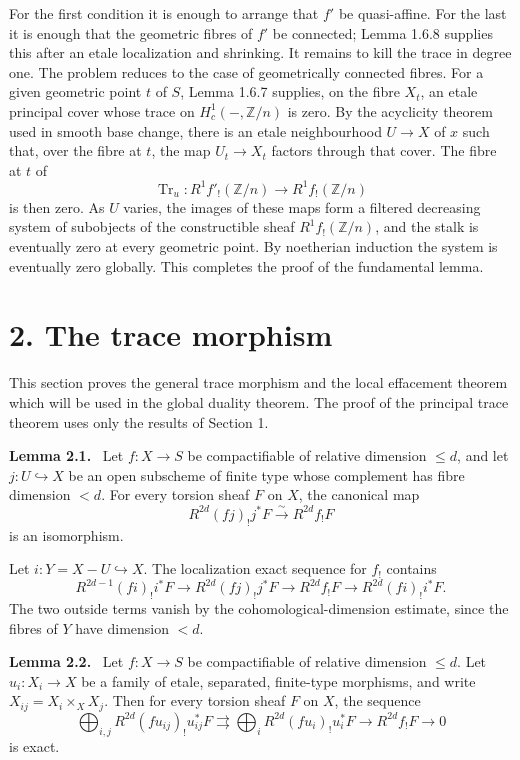 \documentclass[12pt]{article}
\newcommand{\Zz}{\mathbb Z}
\newenvironment{statement}[1]{\par\medskip\noindent\textbf{#1.}\ }{\par\medskip}
\begin{document}
For the first condition it is enough to arrange that \(f'\) be quasi-affine. For the last it is enough that the geometric fibres of \(f'\) be connected; Lemma 1.6.8 supplies this after an etale localization and shrinking. It remains to kill the trace in degree one. The problem reduces to the case of geometrically connected fibres. For a given geometric point \(t\) of \(S\), Lemma 1.6.7 supplies, on the fibre \(X_t\), an etale principal cover whose trace on \(H^1_c(-,\Zz/n)\) is zero. By the acyclicity theorem used in smooth base change, there is an etale neighbourhood \(U\to X\) of \(x\) such that, over the fibre at \(t\), the map \(U_t\to X_t\) factors through that cover. The fibre at \(t\) of
\[
\operatorname{Tr}_{u}:R^1f'_!(\Zz/n)\to R^1f_!(\Zz/n)
\tag{1.6.9.2}
\]
is then zero. As \(U\) varies, the images of these maps form a filtered decreasing system of subobjects of the constructible sheaf \(R^1f_!(\Zz/n)\), and the stalk is eventually zero at every geometric point. By noetherian induction the system is eventually zero globally. This completes the proof of the fundamental lemma.


\section*{2. The trace morphism}

This section proves the general trace morphism and the local effacement theorem which will be used in the global duality theorem. The proof of the principal trace theorem uses only the results of Section 1.

\begin{statement}{Lemma 2.1}
Let \(f:X\to S\) be compactifiable of relative dimension \(\leq d\), and let \(j:U\hookrightarrow X\) be an open subscheme of finite type whose complement has fibre dimension \(<d\). For every torsion sheaf \(F\) on \(X\), the canonical map
\[
R^{2d}(fj)_!j^*F\xrightarrow{\sim}R^{2d}f_!F
\]
is an isomorphism.
\end{statement}

Let \(i:Y=X-U\hookrightarrow X\). The localization exact sequence for \(f_!\) contains
\[
R^{2d-1}(fi)_!i^*F\to R^{2d}(fj)_!j^*F\to R^{2d}f_!F\to R^{2d}(fi)_!i^*F.
\]
The two outside terms vanish by the cohomological-dimension estimate, since the fibres of \(Y\) have dimension \(<d\).

\begin{statement}{Lemma 2.2}
Let \(f:X\to S\) be compactifiable of relative dimension \(\leq d\). Let \(u_i:X_i\to X\) be a family of etale, separated, finite-type morphisms, and write \(X_{ij}=X_i\times_X X_j\). Then for every torsion sheaf \(F\) on \(X\), the sequence
\[
\bigoplus_{i,j}R^{2d}(fu_{ij})_!u_{ij}^*F
\rightrightarrows
\bigoplus_iR^{2d}(fu_i)_!u_i^*F
\to R^{2d}f_!F\to0
\]
is exact.
\end{statement}
\end{document}
